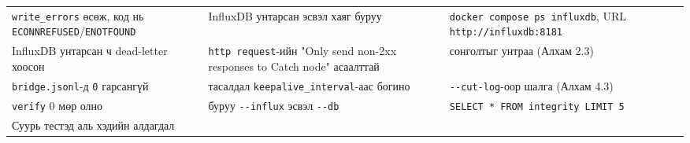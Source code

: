 \begin{longtable}[]{@{}lll@{}}
\begin{minipage}[t]{0.30\columnwidth}
\texttt{write\_errors} өсөж, код нь \texttt{ECONNREFUSED}/\allowbreak\texttt{ENOTFOUND}\strut
\end{minipage} & \begin{minipage}[t]{0.30\columnwidth}\raggedright
InfluxDB унтарсан эсвэл хаяг буруу\strut
\end{minipage} & \begin{minipage}[t]{0.30\columnwidth}\raggedright
\texttt{docker\ compose\ ps\ influxdb}, URL \texttt{http:\allowbreak{}/\allowbreak{}/\allowbreak{}influxdb:\allowbreak{}8181}\strut
\end{minipage}\tabularnewline
\begin{minipage}[t]{0.30\columnwidth}\raggedright
InfluxDB унтарсан ч dead-letter хоосон\strut
\end{minipage} & \begin{minipage}[t]{0.30\columnwidth}\raggedright
\texttt{http\ request}-ийн "Only send non-2xx responses to Catch node" асаалттай\strut
\end{minipage} & \begin{minipage}[t]{0.30\columnwidth}\raggedright
сонголтыг унтраа (Алхам 2.3)\strut
\end{minipage}\tabularnewline
\begin{minipage}[t]{0.30\columnwidth}\raggedright
\texttt{bridge.jsonl}-д \texttt{0} гарсангүй\strut
\end{minipage} & \begin{minipage}[t]{0.30\columnwidth}\raggedright
тасалдал \texttt{keepalive\_\allowbreak{}interval}-аас богино\strut
\end{minipage} & \begin{minipage}[t]{0.30\columnwidth}\raggedright
\texttt{-\/-cut-log}-оор шалга (Алхам 4.3)\strut
\end{minipage}\tabularnewline
\begin{minipage}[t]{0.30\columnwidth}\raggedright
\texttt{verify} 0 мөр олно\strut
\end{minipage} & \begin{minipage}[t]{0.30\columnwidth}\raggedright
буруу \texttt{-\/-influx} эсвэл \texttt{-\/-db}\strut
\end{minipage} & \begin{minipage}[t]{0.30\columnwidth}\raggedright
\texttt{SELECT\ *\ FROM\ integrity\ LIMIT\ 5}\strut
\end{minipage}\tabularnewline
\begin{minipage}[t]{0.30\columnwidth}\raggedright
Суурь тестэд аль хэдийн алдагдал\strut
\end{minipage} & \begin{minipage}[t]{0.30\columnwidth}\raggedright

\end{minipage}
\end{longtable}
